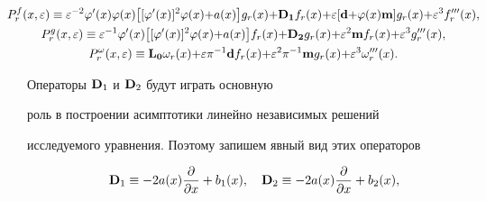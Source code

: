 \begin{gather}


\label{3.5} 


\hspace*{-6mm}P_r^{f} (x,\varepsilon) \equiv \varepsilon^{-2} \varphi ' (x)


\varphi (x) \big[ [\varphi ' (x)]^2 \varphi (x) {+} a (x)


 \big] g_{r} (x) {+} \bold{D_1} f_{r} (x) {+}


\varepsilon [\bold{d} {+} \varphi (x) \bold{m}]


g_{r} (x) {+} \varepsilon^3 f_{r} ''' (x), \\


%


\label{3.6}


\hspace*{-6mm}P_r^{g} (x,\varepsilon) \equiv \varepsilon^{-1}\varphi ' (x)


 \big[[\varphi ' (x)]^2 \varphi (x) {+} a (x) \big] f_{r}


(x) {+} \bold{D_2} g_{r} (x) {+}


\varepsilon^2 \bold{m} f_{r} (x) {+} \varepsilon^3 g_{r} ''' (x), \\


%


\label{3.7}


\hspace*{-6mm}P_r^{\omega} (x,\varepsilon) \equiv \bold{L_0}


\omega_r (x) {+} \varepsilon \pi^{-1} \bold{d} f_{r} (x) {+}


\varepsilon^2 \pi^{-1} \bold{m} g_{r} (x) {+} \varepsilon^3


\omega_{r} ''' (x).


\end{gather}


Операторы $\bold{D}_1$ и $\bold{D}_2$ будут играть основную


роль в построении асимптотики линейно независимых решений


исследуемого уравнения. Поэтому запишем явный вид этих операторов


\begin{equation}


\label{3.8}


\bold{D}_1 \equiv - 2a(x) \frac{\partial}{\partial x} + b_1


(x),\quad 


\bold{D}_2 \equiv - 2a(x) \frac{\partial}{\partial x} + b_2 (x),


\end{equation}


